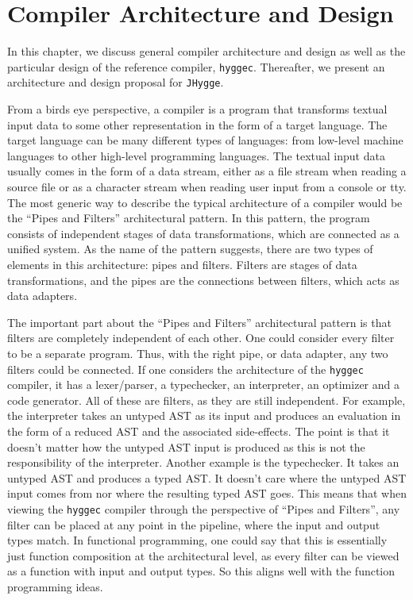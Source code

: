 \chapter{Compiler Architecture and Design}

In this chapter, we discuss general compiler architecture and design as well as the particular design of the reference compiler, \texttt{hyggec}.
Thereafter, we present an architecture and design proposal for \texttt{JHygge}.

From a birds eye perspective, a compiler is a program that transforms textual input data to some other representation in the form of a target language.
The target language can be many different types of languages: from low-level machine languages to other high-level programming languages.
The textual input data usually comes in the form of a data stream, either as a file stream when reading a source file or as a character stream when
reading user input from a console or tty. The most generic way to describe the typical architecture of a compiler would be the ``Pipes and Filters''
architectural pattern. In this pattern, the program consists of independent stages of data transformations, which are connected as a unified system.
As the name of the pattern suggests, there are two types of elements in this architecture: pipes and filters. Filters are stages of data transformations,
and the pipes are the connections between filters, which acts as data adapters.

The important part about the ``Pipes and Filters'' architectural pattern is that filters are completely independent of each other. One could consider
every filter to be a separate program. Thus, with the right pipe, or data adapter, any two filters could be connected. If one considers the architecture
of the \texttt{hyggec} compiler, it has a lexer/parser, a typechecker, an interpreter, an optimizer and a code generator. All of these are filters,
as they are still independent. For example, the interpreter takes an untyped AST as its input and produces an evaluation in the form of a reduced AST
and the associated side-effects. The point is that it doesn't matter how the untyped AST input is produced as this is not the responsibility of the
interpreter. Another example is the typechecker. It takes an untyped AST and produces a typed AST. It doesn't care where the untyped AST input comes
from nor where the resulting typed AST goes. This means that when viewing the \texttt{hyggec} compiler through the perspective of ``Pipes and Filters'',
any filter can be placed at any point in the pipeline, where the input and output types match. In functional programming, one could say that this is
essentially just function composition at the architectural level, as every filter can be viewed as a function with input and output types.
So this aligns well with the function programming ideas.

